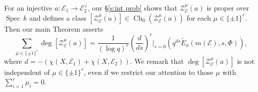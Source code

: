 \documentclass[reqno]{amsart}
\numberwithin{equation}{section}
\newcommand{\wt}[1]{\widetilde{#1}}
\DeclareMathOperator{\Spec}{Spec\,}
\DeclareMathOperator{\Ch}{Ch}
\newcommand\cE{\mathcal{E}}
\newcommand\cZ{\mathcal{Z}}
\theoremstyle{remark}
\numberwithin{equation}{section}
\begin{document}
For an injective $a:\cE_1\to\cE_2^\vee$, our \S\ref{s:int prob} shows that $\cZ_{\cE}^\mu(a)$ is proper over $\Spec k$ and  defines a class $[\cZ_{\cE}^\mu(a)]\in \Ch_0( \cZ_{\cE}^\mu(a))$ for each $\mu\in \{\pm 1\}^r$.  Then our main Theorem asserts 
\begin{equation}\label{eq: SWF spl}
\sum_{\mu\in \{\pm 1\}^r} \deg [\cZ_{\cE}^\mu(a)] = \frac{1}{(\log q)^r}  \left(\frac{d}{ds}\right)^r\Big|_{s=0}  \left( q^{ds} \wt{E}_{a}(m(\cE),s,\Phi) \right),
\end{equation}
where $d=-(\chi(X,\cE_1)+\chi(X,\cE_2))$. We remark that $\deg [\cZ_{\cE}^\mu(a)]$ is not independent of $\mu \in \{\pm 1\}^r$, even if we restrict our attention to those $\mu$ with $\sum_{i=1}^r \mu_i = 0$. 


  





\end{document}
